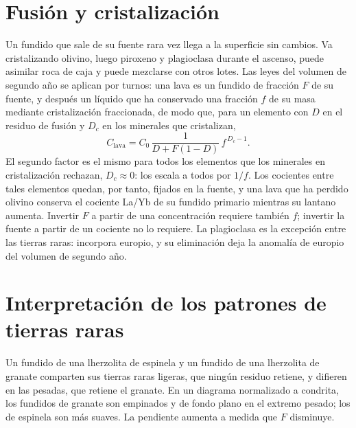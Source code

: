 \section{Fusión y cristalización}\label{sec:b3:trace-element-modelling:crystallisation}

Un fundido que sale de su fuente rara vez llega a la superficie sin cambios. Va
cristalizando olivino, luego piroxeno y plagioclasa durante el ascenso, puede
asimilar roca de caja y puede mezclarse con otros lotes. Las leyes del volumen de
segundo año se aplican por turnos: una lava es un fundido de fracción $F$ de su
fuente, y después un líquido que ha conservado una fracción $f$ de su masa mediante
cristalización fraccionada, de modo que, para un elemento con $D$ en el residuo de
fusión y $D_c$ en los minerales que cristalizan,
\[
C_{\text{lava}} = C_0\,\frac{1}{D + F(1 - D)}\,f^{\,D_c - 1}.
\]
El segundo factor es el mismo para todos los elementos que los minerales en
cristalización rechazan, $D_c \approx 0$: los escala a todos por $1/f$. Los cocientes entre
tales elementos quedan, por tanto, fijados en la fuente, y una lava que ha perdido olivino
conserva el cociente La/Yb de su fundido primario mientras su lantano aumenta. Invertir $F$
a partir de una concentración requiere también $f$; invertir la fuente a partir de un cociente
no lo requiere. La plagioclasa es la excepción entre las tierras raras: incorpora europio,
y su eliminación deja la anomalía de europio del volumen de segundo año.

\section{Interpretación de los patrones de tierras raras}\label{sec:b3:trace-element-modelling:patterns}

Un fundido de una lherzolita de espinela y un fundido de una lherzolita de granate
comparten sus tierras raras ligeras, que ningún residuo retiene, y difieren en las
pesadas, que retiene el granate. En un diagrama normalizado a condrita, los fundidos de
granate son empinados y de fondo plano en el extremo pesado; los de espinela son más suaves. La
pendiente aumenta a medida que $F$ disminuye.

